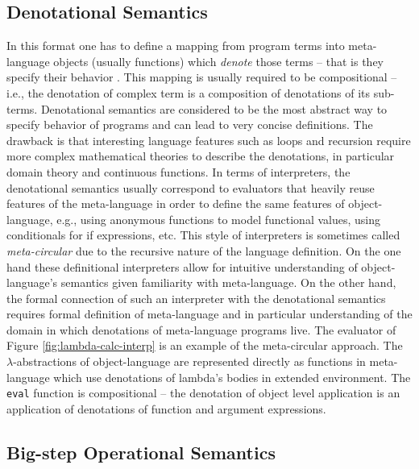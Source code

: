 \subsection*{Denotational Semantics}
In this format one has to define a mapping from program terms into meta-language objects (usually functions) which \emph{denote} those terms -- that is they specify their behavior \cite{scott-denotational-semantics}.
This mapping is usually required to be compositional -- i.e., the denotation of complex term is a composition of denotations of its sub-terms.
Denotational semantics are considered to be the most abstract way to specify behavior of programs and can lead to very concise definitions.
The drawback is that interesting language features such as loops and recursion require more complex mathematical theories to describe the denotations, in particular domain theory and continuous functions.
In terms of interpreters, the denotational semantics usually correspond to evaluators that heavily reuse features of the meta-language in order to define the same features of object-language, e.g., using anonymous functions to model functional values, using conditionals for if expressions, etc.
This style of interpreters is sometimes called \textit{meta-circular} due to the recursive nature of the language definition.
On the one hand these definitional interpreters allow for intuitive understanding of object-language's semantics given familiarity with meta-language.
On the other hand, the formal connection of such an interpreter with the denotational semantics requires formal definition of meta-language and in particular understanding of the domain in which denotations of meta-language programs live.
The evaluator of Figure \ref{fig:lambda-calc-interp} is an example of the meta-circular approach.
The $\lambda$-abstractions of object-language are represented directly as functions in meta-language which use denotations of lambda's bodies in extended environment.
The \lstinline!eval! function is compositional -- the denotation of object level application is an application of denotations of function and argument expressions.

\subsection*{Big-step Operational Semantics}


